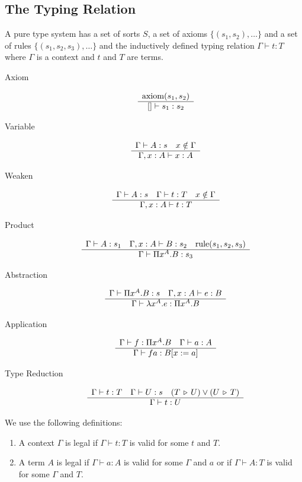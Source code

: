 \documentclass[12pt]{article}
\begin{document}
\subsection{The Typing Relation}

\begin{definition}
  A pure type system has a set of sorts $S$, a set of axioms
  $\{(s_1,s_2), \ldots\}$ and a set of rules $\{(s_1,s_2,s_3), \ldots \}$ and
  the inductively defined typing relation $\Gamma \vdash t: T$ where $\Gamma$
  is a context and $t$ and $T$ are terms.
  \begin{description}

  \item[Axiom] $$\begin{array}{c}  \text{axiom}(s_1,s_2) \\ \hline [] \vdash s_1:s_2\end{array}$$

  \item[Variable]
    $$\begin{array}{c} \Gamma \vdash A:s\quad x \notin \Gamma \\ \hline \Gamma,x:A \vdash x:A\end{array}$$


  \item[Weaken]
    $$\begin{array}{c} \Gamma \vdash A:s \quad  \Gamma \vdash t:T   \quad x \notin \Gamma \\ \hline \Gamma,x:A \vdash t:T\end{array}$$


  \item[Product]
    $$\begin{array}{c} \Gamma \vdash A:s_1 \quad
      \Gamma,x:A \vdash B:s_2 \quad
      \text{rule}(s_1,s_2,s_3) \\ \hline \Gamma \vdash \Pi x^A . B : s_3\end{array}
    $$

  \item[Abstraction]
    $$\begin{array}{c} \Gamma \vdash \Pi x^A.B: s \quad
      \Gamma,x:A \vdash e:B
     \\ \hline \Gamma \vdash \lambda x^A.e : \Pi x^A . B\end{array}
    $$

  \item[Application]
    $$\begin{array}{c} \Gamma \vdash f: \Pi x^A.B \quad
      \Gamma \vdash a:A
     \\ \hline \Gamma \vdash f a : B[x:=a]\end{array}
    $$

  \item[Type Reduction]
    $$\begin{array}{c} \Gamma \vdash t: T \quad
      \Gamma\vdash U: s \quad
      (T \,\triangleright\, U) \lor (U \,\triangleright\, T)
     \\ \hline \Gamma \vdash t: U\end{array}
    $$
  \end{description}
\end{definition}

We use the following definitions:
\begin{enumerate}

\item A context $\Gamma$ is legal if $\Gamma \vdash t:T$ is valid for some $t$
  and $T$.


\item A term $A$ is legal if $\Gamma \vdash a:A$ is valid for some $\Gamma$
  and $a$ or if $\Gamma\vdash A:T$ is valid for some $\Gamma$ and $T$.
\end{enumerate}
\end{document}
